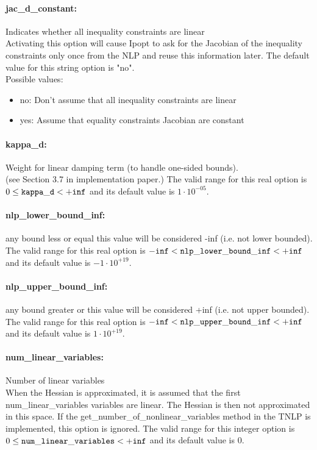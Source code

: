 \paragraph{jac\_d\_constant:}\label{sec:jac_d_constant} Indicates whether all inequality constraints are linear $\;$ \\
 Activating this option will cause Ipopt to ask
for the Jacobian of the inequality constraints
only once from the NLP and reuse this information
later.
The default value for this string option is "no".
\\ 
Possible values:
\begin{itemize}
   \item no: Don't assume that all inequality constraints
are linear
   \item yes: Assume that equality constraints Jacobian are
constant
\end{itemize}

\paragraph{kappa\_d:}\label{sec:kappa_d} Weight for linear damping term (to handle one-sided bounds). $\;$ \\
 (see Section 3.7 in implementation paper.) The valid range for this real option is 
$0 \le {\tt kappa\_d } <  {\tt +inf}$
and its default value is $1 \cdot 10^{-05}$.


\paragraph{nlp\_lower\_bound\_inf:}\label{sec:nlp_lower_bound_inf} any bound less or equal this value will be considered -inf (i.e. not lower bounded). $\;$ \\
 The valid range for this real option is 
${\tt -inf} <  {\tt nlp\_lower\_bound\_inf } <  {\tt +inf}$
and its default value is $-1 \cdot 10^{+19}$.


\paragraph{nlp\_upper\_bound\_inf:}\label{sec:nlp_upper_bound_inf} any bound greater or this value will be considered +inf (i.e. not upper bounded). $\;$ \\
 The valid range for this real option is 
${\tt -inf} <  {\tt nlp\_upper\_bound\_inf } <  {\tt +inf}$
and its default value is $1 \cdot 10^{+19}$.


\paragraph{num\_linear\_variables:}\label{sec:num_linear_variables} Number of linear variables $\;$ \\
 When the Hessian is approximated, it is assumed
that the first num\_linear\_variables variables
are linear.  The Hessian is then not approximated
in this space.  If the
get\_number\_of\_nonlinear\_variables method in
the TNLP is implemented, this option is ignored. The valid range for this integer option is
$0 \le {\tt num\_linear\_variables } <  {\tt +inf}$
and its default value is $0$.


